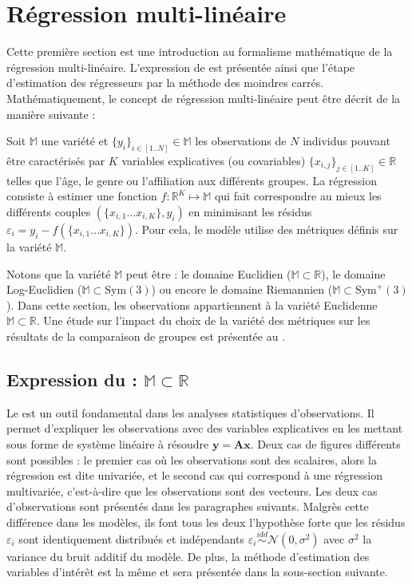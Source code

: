 \section{Régression multi-linéaire}
Cette première section est une introduction au formalisme mathématique de la régression multi-linéaire.
L'expression de \mlg est présentée ainsi que l'étape d'estimation des régresseurs par la méthode des moindres carrés.
Mathématiquement, le concept de régression multi-linéaire peut être décrit de la manière suivante :\\
\begin{adjustwidth}{1cm}{}
    Soit $\mathbb{M}$ une variété et $\{y_i\}_{i \in [1..N]} \in \mathbb{M}$ les observations de $N$ individus pouvant être caractérisés 
    par $K$ variables explicatives (ou covariables) $\{x_{i,j}\}_{j \in [1..K]} \in \mathbb{R}$ telles que l'âge, le genre ou l'affiliation aux différents groupes.
    La régression consiste à estimer une fonction $f : \mathbb{R}^{K} \mapsto \mathbb{M}$ 
    qui fait correspondre au mieux les différents couples $(\{x_{i,1} \dots x_{i,K} \} ,y_i)$
    en minimisant les résidus $\varepsilon_i = y_i - f(\{x_{i,1} \dots x_{i,K} \})$. 
    Pour cela, le modèle utilise des métriques définis sur la variété $\mathbb{M}$.\\
\end{adjustwidth}

Notons que la variété $\mathbb{M}$ peut être : le domaine Euclidien ($\mathbb{M} \subset \mathbb{R}$), le domaine Log-Euclidien ($\mathbb{M} \subset \mbox{Sym}(3)$) 
ou encore le domaine Riemannien ($\mathbb{M} \subset \mbox{Sym}^+(3)$).
Dans cette section, les observations appartiennent à la variété Euclidenne $\mathbb{M} \subset \mathbb{R}$.
Une étude sur l'impact du choix de la variété des métriques sur les résultats de la comparaison de groupes est présentée au .

\subsection{Expression du \mlg : $\mathbb{M} \subset \mathbb{R}$}
Le \mlg est un outil fondamental dans les analyses statistiques d'observations.
Il permet d'expliquer les observations avec des variables explicatives en les mettant sous forme de système linéaire
à résoudre $\mathbf{y} = \mathbf{Ax}$.
Deux cas de figures différents sont possibles : le premier cas où les observations sont des scalaires, alors la régression est dite univariée, 
et le second cas qui correspond à une régression multivariée, c'est-à-dire que les observations sont des vecteurs.
Les deux cas d'observations sont présentés dans les paragraphes suivants.
Malgrès cette différence dans les modèles, ils font tous les deux l'hypothèse forte que les résidus $\varepsilon_i$ sont identiquement distribués 
et indépendants $\varepsilon_{i} \overset{idd}{\sim} \mathcal{N}(0, \sigma^2)$ avec $\sigma^2$ la variance du bruit additif du modèle.
De plus, la méthode d'estimation des variables d'intérêt est la même et sera présentée dans la sous-section suivante.

